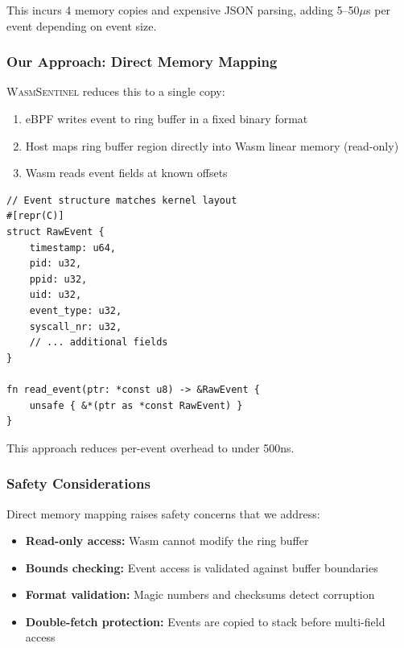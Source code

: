 This incurs 4 memory copies and expensive JSON parsing, adding 5--50$\mu$s per event depending on event size.

\subsubsection{Our Approach: Direct Memory Mapping}

\textsc{WasmSentinel} reduces this to a single copy:
\begin{enumerate}
    \item eBPF writes event to ring buffer in a fixed binary format
    \item Host maps ring buffer region directly into Wasm linear memory (read-only)
    \item Wasm reads event fields at known offsets
\end{enumerate}

\begin{lstlisting}[style=rust, caption={Zero-copy event access in Wasm.}]
// Event structure matches kernel layout
#[repr(C)]
struct RawEvent {
    timestamp: u64,
    pid: u32,
    ppid: u32,
    uid: u32,
    event_type: u32,
    syscall_nr: u32,
    // ... additional fields
}

fn read_event(ptr: *const u8) -> &RawEvent {
    unsafe { &*(ptr as *const RawEvent) }
}
\end{lstlisting}

This approach reduces per-event overhead to under 500ns.

\subsubsection{Safety Considerations}

Direct memory mapping raises safety concerns that we address:
\begin{itemize}
    \item \textbf{Read-only access:} Wasm cannot modify the ring buffer
    \item \textbf{Bounds checking:} Event access is validated against buffer boundaries
    \item \textbf{Format validation:} Magic numbers and checksums detect corruption
    \item \textbf{Double-fetch protection:} Events are copied to stack before multi-field access
\end{itemize}

